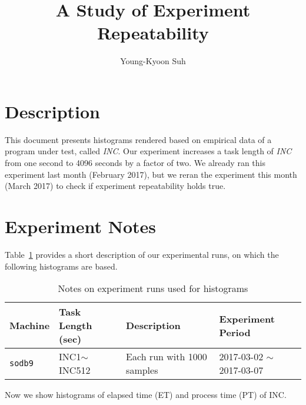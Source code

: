 \documentclass[10pt]{article}
\begin{document}
\title{A Study of Experiment Repeatability}

\author{
Young-Kyoon Suh\\
}
\maketitle

\section{Description}
This document presents histograms rendered based on empirical data 
of a program under test, called {\em INC}. 
Our experiment increases a task length of {\em INC} 
from one second to 4096 seconds by a factor of two.
We already ran this experiment last month (February 2017), 
but we reran the experiment this month (March 2017) 
to check if experiment repeatability holds true.

\section{Experiment Notes}
Table~\ref{tab:exp_notes} provides a short description of our experimental runs, 
on which the following histograms are based.

\begin{table}[h]
\begin{center}
\begin{tabular}{|p{2cm}|p{3cm}|p{6cm}|p{4cm}|} \hline
Machine & Task Length (sec) & Description & Experiment Period\\ \hline
{\tt sodb9} &  INC1$\sim$INC512 & Each run with 1000 samples & 2017-03-02 $\sim$ 2017-03-07\\ \hline
\end{tabular}
\end{center}
\vspace{-.2in}
\caption{Notes on experiment runs used for histograms\label{tab:exp_notes}}
\end{table}

Now we show histograms of elapsed time (ET) and process time (PT) of INC. 

\newpage


\end{document}
